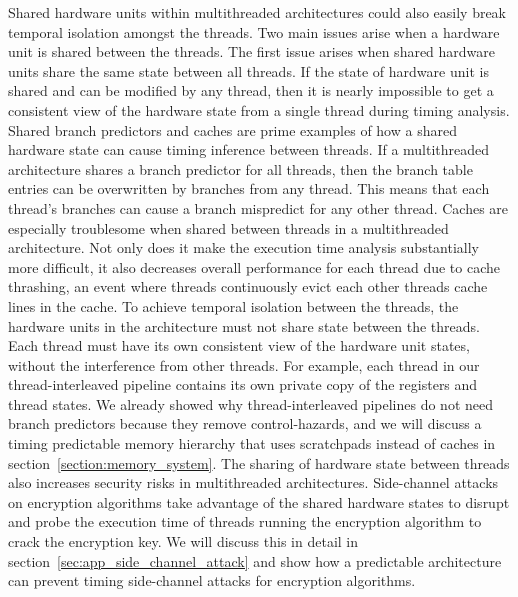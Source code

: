 Shared hardware units within multithreaded architectures could also easily break temporal isolation amongst the threads. 
Two main issues arise when a hardware unit is shared between the threads. 
The first issue arises when shared hardware units share the same state between all threads. 
If the state of hardware unit is shared and can be modified by any thread, then it is nearly impossible to get a consistent view of the hardware state from a single thread during timing analysis.
Shared branch predictors and caches are prime examples of how a shared hardware state can cause timing inference between threads.
If a multithreaded architecture shares a branch predictor for all threads, then the branch table entries can be overwritten by branches from any thread.
This means that each thread's branches can cause a branch mispredict for any other thread. 
Caches are especially troublesome when shared between threads in a multithreaded architecture. 
Not only does it make the execution time analysis substantially more difficult, it also decreases overall performance for each thread due to cache thrashing, an event where threads continuously evict each other threads cache lines in the cache.
To achieve temporal isolation between the threads, the hardware units in the architecture must not share state between the threads. 
Each thread must have its own consistent view of the hardware unit states, without the interference from other threads.
For example, each thread in our thread-interleaved pipeline contains its own private copy of the registers and thread states.    
We already showed why thread-interleaved pipelines do not need branch predictors because they remove control-hazards, and we will discuss a timing predictable memory hierarchy that uses scratchpads instead of caches in section~\ref{section:memory_system}.
The sharing of hardware state between threads also increases security risks in multithreaded architectures. 
Side-channel attacks on encryption algorithms take advantage of the shared hardware states to disrupt and probe the execution time of threads running the encryption algorithm to crack the encryption key.
We will discuss this in detail in section~\ref{sec:app_side_channel_attack} and show how a predictable architecture can prevent timing side-channel attacks for encryption algorithms.   

